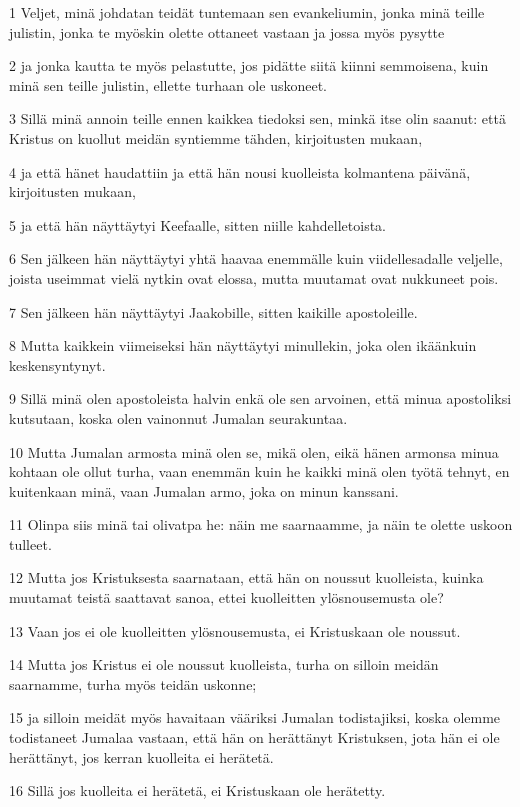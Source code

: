 \par 1 Veljet, minä johdatan teidät tuntemaan sen evankeliumin, jonka minä teille julistin, jonka te myöskin olette ottaneet vastaan ja jossa myös pysytte
\par 2 ja jonka kautta te myös pelastutte, jos pidätte siitä kiinni semmoisena, kuin minä sen teille julistin, ellette turhaan ole uskoneet.
\par 3 Sillä minä annoin teille ennen kaikkea tiedoksi sen, minkä itse olin saanut: että Kristus on kuollut meidän syntiemme tähden, kirjoitusten mukaan,
\par 4 ja että hänet haudattiin ja että hän nousi kuolleista kolmantena päivänä, kirjoitusten mukaan,
\par 5 ja että hän näyttäytyi Keefaalle, sitten niille kahdelletoista.
\par 6 Sen jälkeen hän näyttäytyi yhtä haavaa enemmälle kuin viidellesadalle veljelle, joista useimmat vielä nytkin ovat elossa, mutta muutamat ovat nukkuneet pois.
\par 7 Sen jälkeen hän näyttäytyi Jaakobille, sitten kaikille apostoleille.
\par 8 Mutta kaikkein viimeiseksi hän näyttäytyi minullekin, joka olen ikäänkuin keskensyntynyt.
\par 9 Sillä minä olen apostoleista halvin enkä ole sen arvoinen, että minua apostoliksi kutsutaan, koska olen vainonnut Jumalan seurakuntaa.
\par 10 Mutta Jumalan armosta minä olen se, mikä olen, eikä hänen armonsa minua kohtaan ole ollut turha, vaan enemmän kuin he kaikki minä olen työtä tehnyt, en kuitenkaan minä, vaan Jumalan armo, joka on minun kanssani.
\par 11 Olinpa siis minä tai olivatpa he: näin me saarnaamme, ja näin te olette uskoon tulleet.
\par 12 Mutta jos Kristuksesta saarnataan, että hän on noussut kuolleista, kuinka muutamat teistä saattavat sanoa, ettei kuolleitten ylösnousemusta ole?
\par 13 Vaan jos ei ole kuolleitten ylösnousemusta, ei Kristuskaan ole noussut.
\par 14 Mutta jos Kristus ei ole noussut kuolleista, turha on silloin meidän saarnamme, turha myös teidän uskonne;
\par 15 ja silloin meidät myös havaitaan vääriksi Jumalan todistajiksi, koska olemme todistaneet Jumalaa vastaan, että hän on herättänyt Kristuksen, jota hän ei ole herättänyt, jos kerran kuolleita ei herätetä.
\par 16 Sillä jos kuolleita ei herätetä, ei Kristuskaan ole herätetty.
